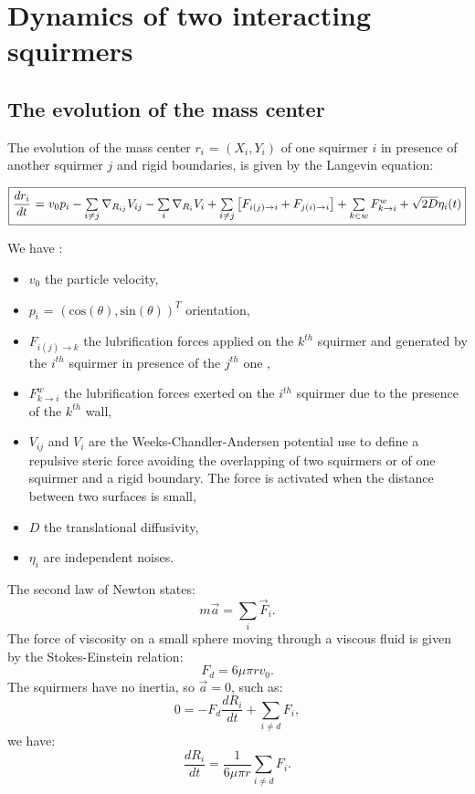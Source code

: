 \documentclass{article}
\begin{document}
\section{Dynamics of two interacting squirmers}
\subsection{The evolution of the mass center}
The evolution of the mass center $r_i$ = $(X_i, Y_i)$ of one squirmer $i$ in presence of 
another squirmer $j$ and rigid boundaries, is given by the Langevin equation:
\begin{center}
$\boxed{\frac{dr_i}{dt}$ = $v_0 p_i -  \sum\limits_{i \ne j}\nabla_{R_{ij}} V_{ij} - \sum\limits_{i}\nabla_{R_i} V_i + \sum\limits_{i\ne j}\left[F_{i(j)\rightarrow i} + F_{j(i)\rightarrow i}\right]+ \sum\limits_{k \in w}F_{k\rightarrow i}^w + \sqrt{2D}\eta_i(t)}$
\end{center}
We have : \begin{itemize}
    \item $v_0$ the particle velocity,
    \item $p_i$ = $(\mathrm{cos}(\theta),\mathrm{sin}(\theta))^T$ orientation,
    \item $F_{i(j)\rightarrow k}$ the lubrification forces applied on the $k^{th}$ squirmer and generated by the $i^{th}$ squirmer in presence of the $j^{th}$ one \cite{Brumley},
    \item $F^w_{k\rightarrow i}$ the lubrification forces exerted on the $i^{th}$ squirmer due to the presence of the $k^{th}$ wall\cite{Brumley},
    \item $V_{ij}$ and $V_i$ are the Weeks-Chandler-Andersen potential use to define a repulsive steric force avoiding 
    the overlapping of two squirmers or of one squirmer and a rigid boundary. 
    The force is activated when the distance between two surfaces is small,
    \item $D$ the translational diffusivity,
    \item $\eta_i$ are independent noises. 
\end{itemize} 
\vspace{0,5cm}
The second law of Newton states:
$$m\vec{a} = \sum\limits_i \vec{F}_i.$$
The force of viscosity on a small sphere moving through a viscous fluid is given by the Stokes-Einstein relation\cite{Stokes}:
$$F_d = 6\mu\pi rv_0.$$
The squirmers have no inertia, so $\vec{a} = 0$, such as:
$$0 = -F_d\frac{dR_i}{dt} + \sum\limits_{i \ne d} F_i,$$
we have:
$$\frac{dR_i}{dt} = \frac{1}{6\mu\pi r}\sum\limits_{i \ne d} F_i.$$
\end{document}
